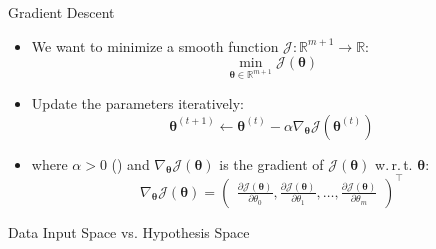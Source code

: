\begin{frame}{Gradient Descent}{}\important
	\begin{itemize}
		\item We want to minimize a smooth function $\mathcal{J} : \mathbb{R}^{m+1} \rightarrow \mathbb{R}$:
		\begin{equation*}
			\min_{\bm{\theta} \in \mathbb{R}^{m+1}} \mathcal{J}(\bm{\theta})
		\end{equation*}
		\item Update the parameters iteratively:
		\begin{equation}
			\bm{\theta}^{(t+1)} \longleftarrow \bm{\theta}^{(t)} -
				\alpha \nabla_{\bm{\theta}} \mathcal{J}(\bm{\theta}^{(t)})
		\end{equation}
		\item where $\alpha > 0$ () and $\nabla_{\bm{\theta}} \mathcal{J}(\bm{\theta})$
			is the gradient of $\mathcal{J}(\bm{\theta})$ w.\,r.\,t. $\bm{\theta}$:
		\begin{equation*}
			\nabla_{\bm{\theta}} \mathcal{J}(\bm{\theta}) = 
			\begin{pmatrix}
				\frac{\partial \mathcal{J}(\bm{\theta})}{\partial \theta_0},
				\frac{\partial \mathcal{J}(\bm{\theta})}{\partial \theta_1}, 
				\dots,
				\frac{\partial \mathcal{J}(\bm{\theta})}{\partial \theta_{m}}
			\end{pmatrix}^{\intercal}
		\end{equation*}
	\end{itemize}
\end{frame}


\begin{frame}{Data Input Space vs. Hypothesis Space}{}
\end{frame}



